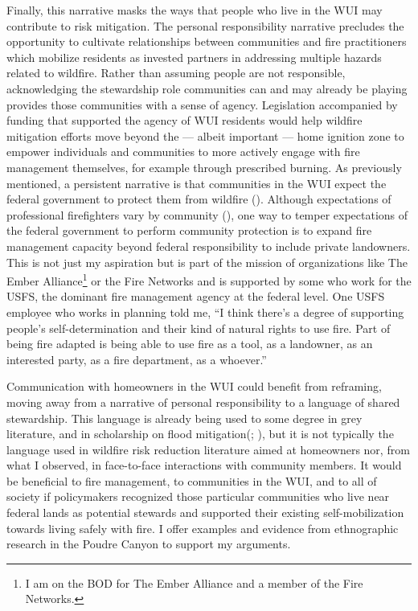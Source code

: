 \documentclass[
]{article}
\begin{document}
Finally, this narrative masks the ways that people who live in the WUI may contribute to risk mitigation. The personal responsibility narrative precludes the opportunity to cultivate relationships between communities and fire practitioners which mobilize residents as invested partners in addressing multiple hazards related to wildfire. Rather than assuming people are not responsible, acknowledging the stewardship role communities can and may already be playing provides those communities with a sense of agency. Legislation accompanied by funding that supported the agency of WUI residents would help wildfire mitigation efforts move beyond the --- albeit important --- home ignition zone to empower individuals and communities to more actively engage with fire management themselves, for example through prescribed burning. As previously mentioned, a persistent narrative is that communities in the WUI expect the federal government to protect them from wildfire (). Although expectations of professional firefighters vary by community (), one way to temper expectations of the federal government to perform community protection is to expand fire management capacity beyond federal responsibility to include private landowners. This is not just my aspiration but is part of the mission of organizations like The Ember Alliance\footnote{I am on the BOD for The Ember Alliance and a member of the Fire Networks.} or the Fire Networks and is supported by some who work for the USFS, the dominant fire management agency at the federal level. One USFS employee who works in planning told me, ``I think there's a degree of supporting people's self-determination and their kind of natural rights to use fire. Part of being fire adapted is being able to use fire as a tool, as a landowner, as an interested party, as a fire department, as a whoever.''

Communication with homeowners in the WUI could benefit from reframing, moving away from a narrative of personal responsibility to a language of shared stewardship. This language is already being used to some degree in grey literature, and in scholarship on flood mitigation(; ), but it is not typically the language used in wildfire risk reduction literature aimed at homeowners nor, from what I observed, in face-to-face interactions with community members. It would be beneficial to fire management, to communities in the WUI, and to all of society if policymakers recognized those particular communities who live near federal lands as potential stewards and supported their existing self-mobilization towards living safely with fire. I offer examples and evidence from ethnographic research in the Poudre Canyon to support my arguments.
\end{document}
